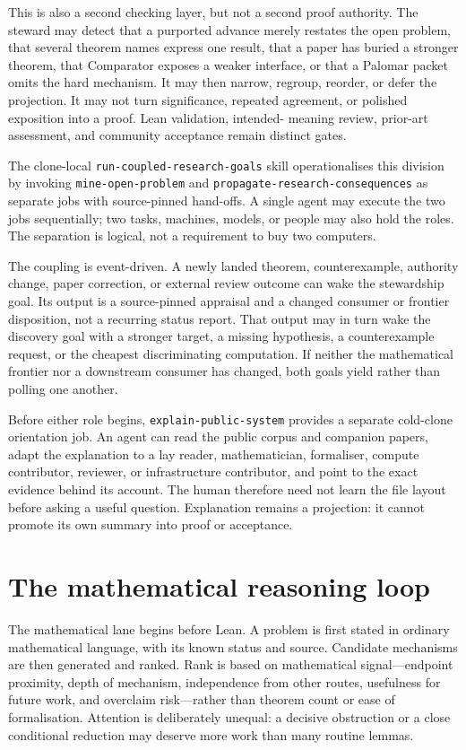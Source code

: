 \documentclass[10pt]{article}
\begin{document}
This is also a second checking layer, but not a second proof authority. The
steward may detect that a purported advance merely restates the open problem,
that several theorem names express one result, that a paper has buried a
stronger theorem, that Comparator exposes a weaker interface, or that a
Palomar packet omits the hard mechanism. It may then narrow, regroup,
reorder, or defer the projection. It may not turn significance, repeated
agreement, or polished exposition into a proof. Lean validation, intended-
meaning review, prior-art assessment, and community acceptance remain
distinct gates.

The clone-local \texttt{run-coupled-research-goals} skill operationalises this
division by invoking \texttt{mine-open-problem} and
\texttt{propagate-research-consequences} as separate jobs with source-pinned
hand-offs. A single agent may execute the two jobs sequentially; two tasks,
machines, models, or people may also hold the roles. The separation is logical,
not a requirement to buy two computers.

The coupling is event-driven. A newly landed theorem, counterexample,
authority change, paper correction, or external review outcome can wake the
stewardship goal. Its output is a source-pinned appraisal and a changed
consumer or frontier disposition, not a recurring status report. That output
may in turn wake the discovery goal with a stronger target, a missing
hypothesis, a counterexample request, or the cheapest discriminating
computation. If neither the mathematical frontier nor a downstream consumer
has changed, both goals yield rather than polling one another.

Before either role begins, \texttt{explain-public-system} provides a separate
cold-clone orientation job. An agent can read the public corpus and companion
papers, adapt the explanation to a lay reader, mathematician, formaliser,
compute contributor, reviewer, or infrastructure contributor, and point to the
exact evidence behind its account. The human therefore need not learn the file
layout before asking a useful question. Explanation remains a projection: it
cannot promote its own summary into proof or acceptance.

\section{The mathematical reasoning loop}\label{sec:mathloop}

The mathematical lane begins before Lean. A problem is first stated in ordinary
mathematical language, with its known status and source. Candidate mechanisms
are then generated and ranked. Rank is based on mathematical signal---endpoint
proximity, depth of mechanism, independence from other routes, usefulness for
future work, and overclaim risk---rather than theorem count or ease of
formalisation. Attention is deliberately unequal: a decisive obstruction or a
close conditional reduction may deserve more work than many routine lemmas.
\end{document}
